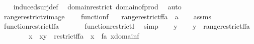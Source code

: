 \begin{isabellebody}
%
\isadelimproof
\ \ %
\endisadelimproof
%
\isatagproof
{}\isamarkupfalse%
\ induced{\isacharunderscore}{\kern0pt}surj{\isacharunderscore}{\kern0pt}def\ \isamarkupfalse%
\ domain{\isacharunderscore}{\kern0pt}restrict\ domain{\isacharunderscore}{\kern0pt}of{\isacharunderscore}{\kern0pt}prod\ \isamarkupfalse%
\ auto%
\endisatagproof
{\isafoldproof}%
%
\isadelimproof
\isanewline
%
\endisadelimproof
\ \ \ \ \isanewline
{}\isamarkupfalse%
\ range{\isacharunderscore}{\kern0pt}restrict{\isacharunderscore}{\kern0pt}vimage{\isacharcolon}{\kern0pt}\ \isanewline
\ \ \ {\isachardoublequoteopen}function{\isacharparenleft}{\kern0pt}f{\isacharparenright}{\kern0pt}{\isachardoublequoteclose}\isanewline
\ \ \ {\isachardoublequoteopen}range{\isacharparenleft}{\kern0pt}restrict{\isacharparenleft}{\kern0pt}f{\isacharcomma}{\kern0pt}f{\isacharminus}{\kern0pt}{\isacharbackquote}{\kern0pt}{\isacharbackquote}{\kern0pt}a{\isacharparenright}{\kern0pt}{\isacharparenright}{\kern0pt}\ {\isasymsubseteq}\ a{\isachardoublequoteclose}\isanewline
%
\isadelimproof
%
\endisadelimproof
%
\isatagproof
{}\isamarkupfalse%
\isanewline
\ \ \isamarkupfalse%
\ assms\ \isanewline
\ \ \isamarkupfalse%
\ {\isachardoublequoteopen}function{\isacharparenleft}{\kern0pt}restrict{\isacharparenleft}{\kern0pt}f{\isacharcomma}{\kern0pt}f{\isacharminus}{\kern0pt}{\isacharbackquote}{\kern0pt}{\isacharbackquote}{\kern0pt}a{\isacharparenright}{\kern0pt}{\isacharparenright}{\kern0pt}{\isachardoublequoteclose}\ \isanewline
\ \ \ \ \isamarkupfalse%
\ function{\isacharunderscore}{\kern0pt}restrictI\ \isamarkupfalse%
\ simp\isanewline
\ \ \isamarkupfalse%
\ y\isanewline
\ \ \isamarkupfalse%
\ {\isachardoublequoteopen}y\ {\isasymin}\ range{\isacharparenleft}{\kern0pt}restrict{\isacharparenleft}{\kern0pt}f{\isacharcomma}{\kern0pt}f{\isacharminus}{\kern0pt}{\isacharbackquote}{\kern0pt}{\isacharbackquote}{\kern0pt}a{\isacharparenright}{\kern0pt}{\isacharparenright}{\kern0pt}{\isachardoublequoteclose}\isanewline
\ \ \isamarkupfalse%
\ \isanewline
\ \ \isamarkupfalse%
\ x\ \ {\isachardoublequoteopen}{\isasymlangle}x{\isacharcomma}{\kern0pt}y{\isasymrangle}\ {\isasymin}\ restrict{\isacharparenleft}{\kern0pt}f{\isacharcomma}{\kern0pt}f{\isacharminus}{\kern0pt}{\isacharbackquote}{\kern0pt}{\isacharbackquote}{\kern0pt}a{\isacharparenright}{\kern0pt}{\isachardoublequoteclose}\ \ {\isachardoublequoteopen}x\ {\isasymin}\ f{\isacharminus}{\kern0pt}{\isacharbackquote}{\kern0pt}{\isacharbackquote}{\kern0pt}a{\isachardoublequoteclose}\ {\isachardoublequoteopen}x{\isasymin}domain{\isacharparenleft}{\kern0pt}f{\isacharparenright}{\kern0pt}{\isachardoublequoteclose}\isanewline

\end{isabellebody}
